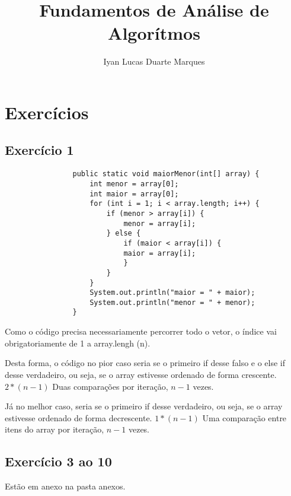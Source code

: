 \documentclass[12pt]{article}
\title{Fundamentos de Análise de Algorítmos}
\author{Iyan Lucas Duarte Marques\inst{1}}
\begin{document}
    
    \section{Exercícios}
        \subsection{Exercício 1}
            \begin{lstlisting}
                public static void maiorMenor(int[] array) {
                    int menor = array[0];
                    int maior = array[0];
                    for (int i = 1; i < array.length; i++) {
                        if (menor > array[i]) {
                            menor = array[i];
                        } else {
                            if (maior < array[i]) {
                            maior = array[i];
                            }
                        } 
                    }
                    System.out.println("maior = " + maior);
                    System.out.println("menor = " + menor);
                }
            \end{lstlisting}
            Como o código precisa necessariamente percorrer todo o vetor, o índice vai obrigatoriamente de 1 a array.lengh (n).
            \par Desta forma, o código no pior caso seria se o primeiro if desse falso e o else if desse verdadeiro, ou seja, se o array estivesse ordenado de forma crescente.
            $2*(n-1)$ Duas comparações por iteração, $n-1$ vezes. 
            \par Já no melhor caso, seria se o primeiro if desse verdadeiro, ou seja, se o array estivesse ordenado de forma decrescente.
            $1*(n-1)$ Uma comparação entre itens do array por iteração, $n-1$ vezes.
        \subsection{Exercício 3 ao 10}
            Estão em anexo na pasta anexos.
\end{document}
